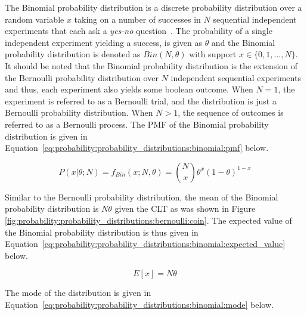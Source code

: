 The Binomial probability distribution is a discrete probability distribution over a random variable $x$ taking on a number of successes in $N$ sequential independent experiments that each ask a \textit{yes-no} question~\cite{ref:wackerly:2014}. The probability of a single independent experiment yielding a success, is given as $\theta$ and the Binomial probability distribution is denoted as $Bin(N, \theta)$ with support $x \in \{0, 1, \dots, N\}$.  It should be noted that the Binomial probability distribution is the extension of the Bernoulli probability distribution over $N$ independent sequential experiments and thus, each experiment also yields some boolean outcome. When $N=1$, the experiment is referred to as a Bernoulli trial, and the distribution is just a Bernoulli probability distribution. When $N > 1$, the sequence of outcomes is referred to as a Bernoulli process. The \acf{PMF} of the Binomial probability distribution is given in Equation~\eqref{eq:probability:probability_distributions:binomial:pmf} below.

\begin{equation}
      \label{eq:probability:probability_distributions:binomial:pmf}
      P(x \vert \theta; N) = f_{Bin}(x; N, \theta) = \binom{N}{x} \theta^{x}(1-\theta)^{1-x}
\end{equation}

Similar to the Bernoulli probability distribution, the mean of the Binomial probability distribution is $N\theta$ given the \acs{CLT} as was shown in Figure \ref{fig:probability:probability_distributions:bernoulli:coin}. The expected value of the Binomial probability distribution is thus given in Equation~\eqref{eq:probability:probability_distributions:binomial:expected_value} below.

\begin{equation}
      \label{eq:probability:probability_distributions:binomial:expected_value}
      E[x] = N\theta
\end{equation}

The mode of the distribution is given in Equation~\eqref{eq:probability:probability_distributions:binomial:mode} below.

